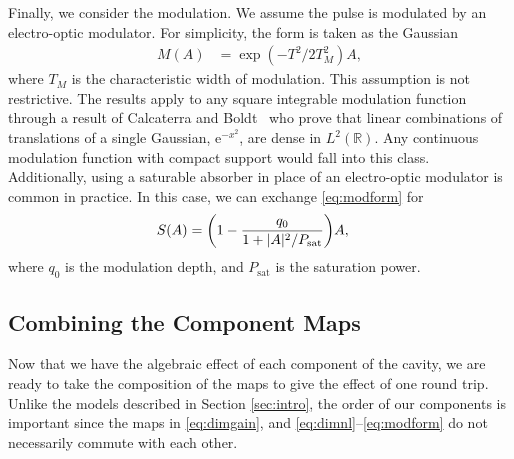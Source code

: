 \documentclass[9pt,twocolumn,twoside]{osajnl}
\let\originalleft\left
\let\originalright\right
\renewcommand{\left}{\mathopen{}\mathclose\bgroup\originalleft}
\renewcommand{\right}{\aftergroup\egroup\originalright}
\begin{document}
Finally, we consider the modulation. We assume the pulse is modulated by an electro-optic modulator. For simplicity, the form is taken as the Gaussian
\begin{align}
	M(A) &= \exp( -T^2 / 2 T_M^2 ) A,
	\label{eq:modform}
\end{align}
where $T_M$ is the characteristic width of modulation. This assumption is not restrictive. The results apply to any square integrable modulation function through a result of Calcaterra and Boldt~\cite{calcaterra2008a} who prove that linear combinations of translations of a single Gaussian, $\textrm{e}^{-x^2}$, are dense in $L^2(\mathbb{R})$. Any continuous modulation function with compact support would fall into this class. Additionally, using a saturable absorber in place of an electro-optic modulator is common in practice. In this case, we can exchange \eqref{eq:modform} for~\cite{lapre2019, meng2020, oktem2010, woodward2018}
\begin{align}
	S(A) &= \left( 1 - \frac{q_0}{1 + |A|^2 / P_\text{sat}} \right) A,
\end{align}
where $q_0$ is the modulation depth, and $P_\text{sat}$ is the saturation power.

\subsection{Combining the Component Maps}
\label{sec:effects}
Now that we have the algebraic effect of each component of the cavity, we are ready to take the composition of the maps to give the effect of one round trip. Unlike the models described in Section \ref{sec:intro}, the order of our components is important since the maps in \eqref{eq:dimgain}, and \eqref{eq:dimnl}--\eqref{eq:modform} do not necessarily commute with each other.
\end{document}
